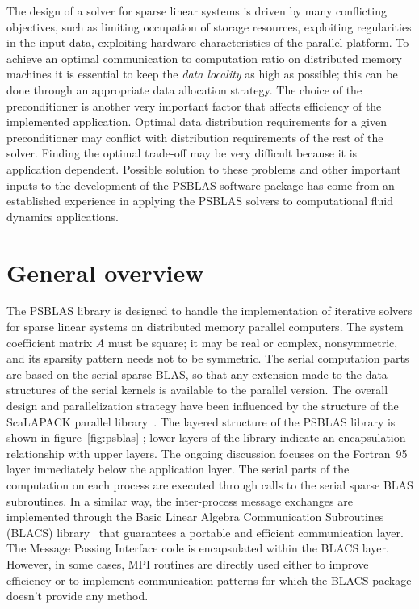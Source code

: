 The design of a solver for sparse linear systems is driven by many
conflicting objectives, such as limiting occupation of storage
resources, exploiting regularities in the input data, exploiting
hardware characteristics of the parallel platform.  To achieve an
optimal communication to computation ratio on distributed memory
machines it is essential to keep the {\em data locality} as high as
possible; this can be done through an appropriate data allocation
strategy.  The choice of the preconditioner is another very important
factor that affects efficiency of the implemented application. Optimal
data distribution requirements for a given preconditioner may conflict
with distribution requirements of the rest of the solver. Finding the
optimal trade-off may be very difficult because it is application
dependent.  Possible solution to these problems and other important
inputs to the development of the PSBLAS software package has come from
an established experience in applying the PSBLAS solvers to
computational fluid dynamics applications.

\section{General overview}
\label{sec:overview} 
The PSBLAS library is designed to handle the implementation of
iterative solvers for sparse linear systems on distributed memory
parallel computers.  The system coefficient matrix $A$ must be square;
it may be real or complex, nonsymmetric, and its sparsity pattern
needs not to be symmetric.  The serial computation parts are based on
the serial sparse BLAS, so that any extension made to the data
structures of the serial kernels is available to the parallel
version. The overall design and parallelization strategy have been
influenced by the structure of the ScaLAPACK parallel
library~\cite{scalapack}.  The layered structure of the PSBLAS library
is shown in figure~\ref{fig:psblas} ; lower layers of the library
indicate an encapsulation relationship with upper layers. The ongoing
discussion focuses on the Fortran~95 layer immediately below the
application layer.
The serial parts of the computation on each process are executed through
calls to the serial sparse BLAS subroutines. In a similar way, the
inter-process message exchanges are implemented through the Basic
Linear Algebra Communication Subroutines (BLACS) library~\cite{BLACS}
that guarantees a portable and efficient communication layer. The
Message Passing Interface code is encapsulated within the BLACS
layer. However, in some cases, MPI routines are directly used either
to improve efficiency or to implement communication patterns for which
the BLACS package doesn't provide any method.

